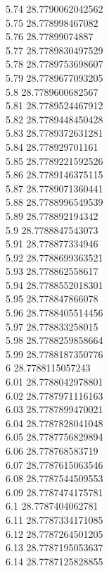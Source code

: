 {5.74	28.7790062042562\\
5.75	28.778998467082\\
5.76	28.77899074887\\
5.77	28.7789830497529\\
5.78	28.7789753698607\\
5.79	28.7789677093205\\
5.8	28.7789600682567\\
5.81	28.7789524467912\\
5.82	28.7789448450428\\
5.83	28.7789372631281\\
5.84	28.778929701161\\
5.85	28.7789221592526\\
5.86	28.7789146375115\\
5.87	28.7789071360441\\
5.88	28.7788996549539\\
5.89	28.778892194342\\
5.9	28.7788847543073\\
5.91	28.778877334946\\
5.92	28.7788699363521\\
5.93	28.778862558617\\
5.94	28.7788552018301\\
5.95	28.778847866078\\
5.96	28.7788405514456\\
5.97	28.778833258015\\
5.98	28.7788259858664\\
5.99	28.7788187350776\\
6	28.7788115057243\\
6.01	28.7788042978801\\
6.02	28.7787971116163\\
6.03	28.7787899470021\\
6.04	28.7787828041048\\
6.05	28.7787756829894\\
6.06	28.778768583719\\
6.07	28.7787615063546\\
6.08	28.7787544509553\\
6.09	28.7787474175781\\
6.1	28.7787404062781\\
6.11	28.7787334171085\\
6.12	28.7787264501205\\
6.13	28.7787195053637\\
6.14	28.7787125828855\\
}
